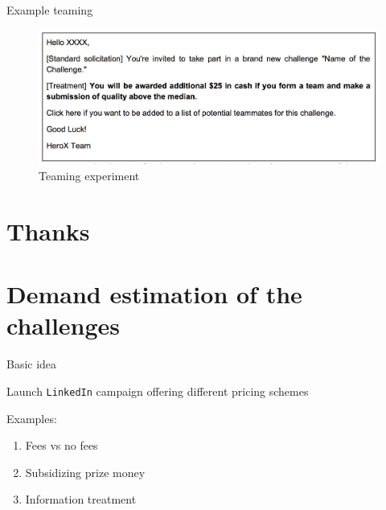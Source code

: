 \begin{frame}{Example teaming}

\begin{figure}
\centering
\includegraphics{solicit_teaming.png}
\caption{Teaming experiment}
\end{figure}

\end{frame}

\section{Thanks}\label{thanks}

\section{Demand estimation of the
challenges}\label{demand-estimation-of-the-challenges}

\begin{frame}[fragile]{Basic idea}

Launch \texttt{LinkedIn} campaign offering different pricing schemes

Examples:

\begin{enumerate}
\def\labelenumi{\arabic{enumi}.}
\tightlist
\item
  Fees vs no fees
\item
  Subsidizing prize money
\item
  Information treatment
\end{enumerate}

\end{frame}
